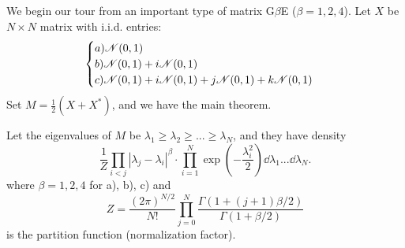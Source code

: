We begin our tour from an important type of matrix G$\beta$E ($\beta=1,2,4$). Let $X$ be $N\times N$ matrix with i.i.d. entries: 
\[
\begin{cases}
    a) \mathcal{N}(0,1) \\
    b) \mathcal{N}(0,1) + i\mathcal{N}(0,1) \\
    c) \mathcal{N}(0,1) + i\mathcal{N}(0,1) + j\mathcal{N}(0,1) + k\mathcal{N}(0,1)
\end{cases}
\]
Set $M = \frac{1}{2}(X+X^*)$, and we have the main theorem.
\begin{thm}
    Let the eigenvalues of $M$ be $\lambda_1\ge \lambda_2\ge ...\ge \lambda_N$, and they have density
    \[
    \frac{1}{Z} \prod_{i<j}|\lambda_j-\lambda_i|^\beta \cdot \prod_{i=1}^N\exp(-\frac{\lambda_i^2}{2}) \dd \lambda_{1}...\dd \lambda_{N}.
    \]
    where $\beta = 1,2,4$ for a), b), c) and 
    \[
    Z = \frac{(2\pi)^{N/2}}{N!} \prod_{j=0}^N \frac{\Gamma(1+(j+1)\beta/2)}{\Gamma(1+\beta/2)}
    \]
    is the partition function (normalization factor).
\end{thm}
